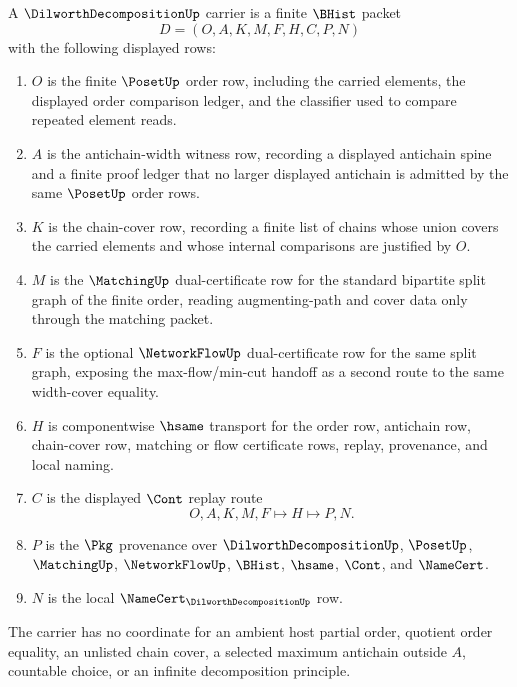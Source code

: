 \begin{definition}
\label{def:dilworth-decomposition-carrier}
A $\DilworthDecompositionUp$ carrier is a finite $\BHist$ packet
$$
D=(O,A,K,M,F,H,C,P,N)
$$
with the following displayed rows:
\begin{enumerate}
\item $O$ is the finite $\PosetUp$ order row, including the carried elements, the displayed order comparison ledger, and the classifier used to compare repeated element reads.
\item $A$ is the antichain-width witness row, recording a displayed antichain spine and a finite proof ledger that no larger displayed antichain is admitted by the same $\PosetUp$ order rows.
\item $K$ is the chain-cover row, recording a finite list of chains whose union covers the carried elements and whose internal comparisons are justified by $O$.
\item $M$ is the $\MatchingUp$ dual-certificate row for the standard bipartite split graph of the finite order, reading augmenting-path and cover data only through the matching packet.
\item $F$ is the optional $\NetworkFlowUp$ dual-certificate row for the same split graph, exposing the max-flow/min-cut handoff as a second route to the same width-cover equality.
\item $H$ is componentwise $\hsame$ transport for the order row, antichain row, chain-cover row, matching or flow certificate rows, replay, provenance, and local naming.
\item $C$ is the displayed $\Cont$ replay route
$$
O,A,K,M,F \longmapsto H \longmapsto P,N .
$$
\item $P$ is the $\Pkg$ provenance over $\DilworthDecompositionUp$, $\PosetUp$, $\MatchingUp$, $\NetworkFlowUp$, $\BHist$, $\hsame$, $\Cont$, and $\NameCert$.
\item $N$ is the local $\NameCert_{\DilworthDecompositionUp}$ row.
\end{enumerate}
The carrier has no coordinate for an ambient host partial order, quotient order equality, an unlisted chain cover, a selected maximum antichain outside $A$, countable choice, or an infinite decomposition principle.
\end{definition}

